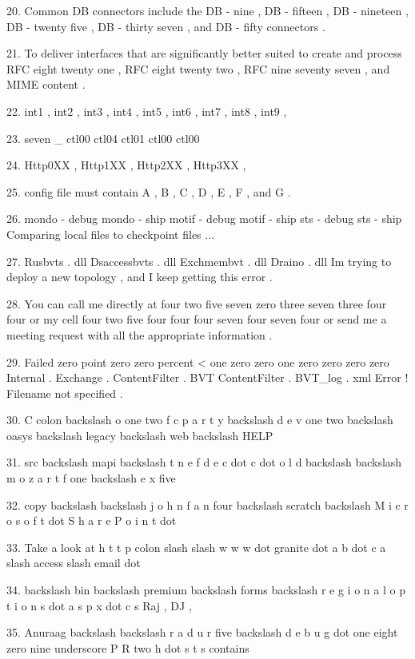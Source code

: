 \documentclass{article}
\begin{document}
{\begin{hangparas}{1.6em}{1}
20. Common DB connectors include the DB - nine , DB - fifteen , DB - nineteen , DB - twenty five , DB - thirty seven , and DB - fifty connectors . \par
21. To deliver interfaces that are significantly better suited  to create and process RFC eight twenty one , RFC eight twenty two , RFC nine seventy seven , and MIME content . \par
22. int1 , int2 , int3 , int4 , int5 , int6 , int7 , int8 , int9 , \par
23. seven \_ ctl00 ctl04 ctl01 ctl00 ctl00 \par
24. Http0XX , Http1XX , Http2XX , Http3XX , \par
25. config file must contain A , B , C , D , E , F , and G . \par
26. mondo - debug mondo - ship motif - debug motif - ship sts - debug sts - ship Comparing local files to checkpoint files ... \par
27. Rusbvts . dll Dsaccessbvts . dll Exchmembvt . dll Draino . dll Im trying to deploy a new topology , and I keep getting this error . \par
28. You can call me directly at four two five seven zero three seven three four four or my cell four two five four four four seven four seven four or send me a meeting request with all the appropriate information . \par
29. Failed zero point zero zero percent < one zero zero one zero zero zero zero Internal . Exchange . ContentFilter . BVT ContentFilter . BVT\_log . xml Error ! Filename not specified . \par
30. C colon backslash o one two f c p a r t y backslash d e v one two backslash oasys backslash legacy backslash web backslash HELP \par
31. src backslash mapi backslash t n e f d e c dot c dot o l d backslash backslash m o z a r t f one backslash e x five \par
32. copy backslash backslash j o h n f a n four backslash scratch backslash M i c r o s o f t dot S h a r e P o i n t dot \par
33. Take a look at h t t p colon slash slash w w w dot granite dot a b dot c a slash access slash email dot \par
34. backslash bin backslash premium backslash forms backslash r e g i o n a l o p t i o n s dot a s p x dot c s Raj , DJ , \par
35. Anuraag backslash backslash r a d u r five backslash d e b u g dot one eight zero nine underscore P R two h dot s t s contains \par

\end{hangparas}}
\end{document}
